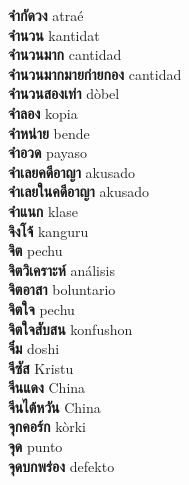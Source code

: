 \textbf{ จำกัดวง  } atraé \\
\textbf{ จำนวน  } kantidat \\
\textbf{ จำนวนมาก  } cantidad \\
\textbf{ จำนวนมากมายก่ายกอง  } cantidad \\
\textbf{ จำนวนสองเท่า  } dòbel \\
\textbf{ จำลอง  } kopia \\
\textbf{ จำหน่าย  } bende \\
\textbf{ จำอวด  } payaso \\
\textbf{ จำเลยคดีอาญา  } akusado \\
\textbf{ จำเลยในคดีอาญา  } akusado \\
\textbf{ จำแนก  } klase \\
\textbf{ จิงโจ้  } kanguru \\
\textbf{ จิต  } pechu \\
\textbf{ จิตวิเคราะห์  } análisis \\
\textbf{ จิตอาสา  } boluntario \\
\textbf{ จิตใจ  } pechu \\
\textbf{ จิตใจสับสน  } konfushon \\
\textbf{ จิ๋ม  } doshi \\
\textbf{ จีซัส  } Kristu \\
\textbf{ จีนแดง  } China \\
\textbf{ จีนไต้หวัน  } China \\
\textbf{ จุกคอร์ก  } kòrki \\
\textbf{ จุด  } punto \\
\textbf{ จุดบกพร่อง  } defekto \\
